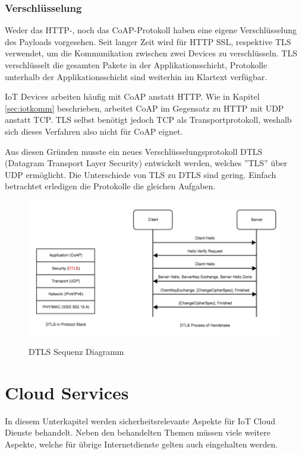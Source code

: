 \subsubsection{Verschlüsselung}
Weder das HTTP-, noch das CoAP-Protokoll haben eine eigene Verschlüsselung des Payloads vorgesehen. Seit langer Zeit wird für HTTP SSL, respektive TLS verwendet, um die Kommunikation zwischen zwei Devices zu verschlüsseln. TLS verschlüsselt die gesamten Pakete in der Applikationsschicht, Protokolle unterhalb der Applikationsschicht sind weiterhin im Klartext verfügbar. 

IoT Devices arbeiten häufig mit CoAP anstatt HTTP. Wie in Kapitel \ref{sec:iotkomm} beschrieben, arbeitet CoAP im Gegensatz zu HTTP mit UDP anstatt TCP. TLS selbst benötigt jedoch TCP als Transportprotokoll, weshalb sich dieses Verfahren also nicht für CoAP eignet.

Aus diesen Gründen musste ein neues Verschlüsselungsprotokoll DTLS (Datagram Transport Layer Security) entwickelt werden, welches ''TLS'' über UDP ermöglicht. Die Unterschiede von TLS zu DTLS sind gering. Einfach betrachtet erledigen die Protokolle die gleichen Aufgaben.

\begin{figure}[H]
\centering
\includegraphics[scale=0.5]{../02_Analyse/images/coap_dtls_diagram.png}
\caption{DTLS Sequenz Diagramm} \cite{DTLSDiagram}
\end{figure}
\newpage
\section{Cloud Services}
In diesem Unterkapitel werden sicherheitsrelevante Aspekte für IoT Cloud Dienste behandelt. Neben den behandelten Themen müssen viele weitere Aspekte, welche für übrige Internetdienste gelten auch eingehalten werden.
